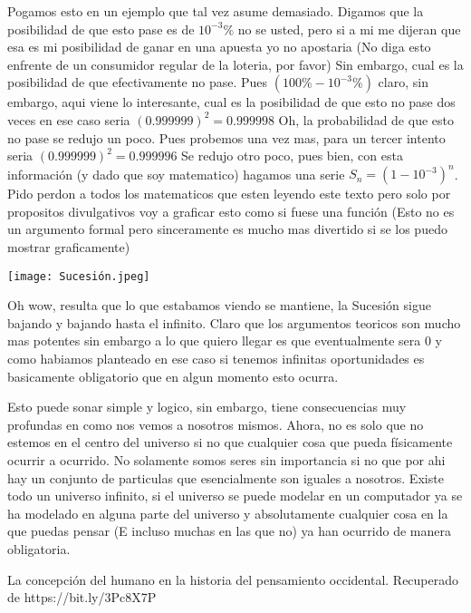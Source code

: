 \documentclass[12pt]{exam}
\newenvironment{Figura}
  {\par\medskip\noindent\minipage{\linewidth}}
  {\endminipage\par\medskip}
\begin{document}
\begin{multicols}{2}
Pogamos esto en un ejemplo que tal vez asume demasiado. Digamos que la posibilidad de que esto pase es de $10^{-3}\%$ no se usted, pero
si a mi me dijeran que esa es mi posibilidad de ganar en una apuesta yo no apostaria (No diga esto enfrente de un consumidor
regular de la loteria, por favor) Sin embargo, cual es la posibilidad de que efectivamente no pase. Pues $(100\% - 10^{-3}\%)$ claro,
sin embargo, aqui viene lo interesante, cual es la posibilidad de que esto no pase dos veces en ese caso seria $(0.999999)^2 = 0.999998$
Oh, la probabilidad de que esto no pase se redujo un poco. Pues probemos una vez mas, para un tercer intento seria $(0.999999)^2 = 0.999996$
Se redujo otro poco, pues bien, con esta información (y dado que soy matematico) hagamos una serie $S_n = (1-10^{-3})^n$.
Pido perdon a todos los matematicos que esten leyendo este texto pero solo por propositos divulgativos voy a graficar esto como
si fuese una función (Esto no es un argumento formal pero sinceramente es mucho mas divertido si se los puedo mostrar graficamente)
\begin{Figura}
    \centering
    \texttt{[image: Sucesión.jpeg]}
  \end{Figura}
Oh wow, resulta que lo que estabamos viendo se mantiene, la Sucesión sigue bajando y bajando hasta el infinito. Claro que 
los argumentos teoricos son mucho mas potentes sin embargo a lo que quiero llegar es que eventualmente sera 0 y como habiamos
planteado en ese caso si tenemos infinitas oportunidades es basicamente obligatorio que en algun momento esto ocurra.

Esto puede sonar simple y logico, sin embargo, tiene consecuencias muy profundas en como nos vemos a nosotros mismos. Ahora,
no es solo que no estemos en el centro del universo si no que cualquier cosa que pueda físicamente ocurrir a ocurrido. No solamente
somos seres sin importancia si no que por ahi hay un conjunto de particulas que esencialmente son iguales a nosotros. Existe
todo un universo infinito, si el universo se puede modelar en un computador ya se ha modelado en alguna parte del universo y
absolutamente cualquier cosa en la que puedas pensar (E incluso muchas en las que no) ya han ocurrido de manera obligatoria.
\end{multicols}
\begin{thebibliography}{1}
    \bibitem[1] La concepción del humano en la historia del pensamiento occidental. Recuperado de https://bit.ly/3Pc8X7P
\end{thebibliography}
\end{document}
